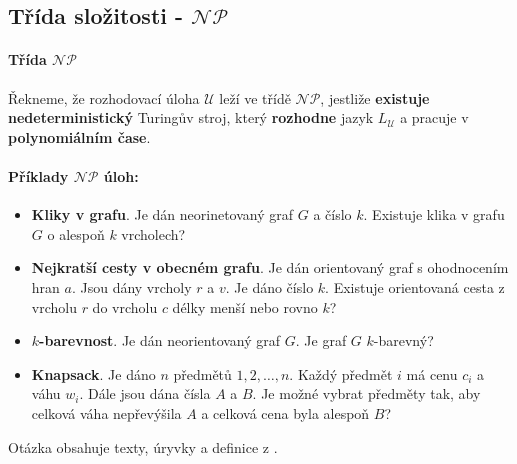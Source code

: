 \subsection*{Třída složitosti - $\mathcal{NP}$}
\label{heading:np}

\paragraph{Třída $\mathcal{NP}$} Řekneme, že rozhodovací úloha $\mathcal{U}$ leží ve třídě $\mathcal{NP}$, jestliže \textbf{existuje nedeterministický} Turingův stroj, který \textbf{rozhodne} jazyk $L_\mathcal{U}$ a pracuje v \textbf{polynomiálním čase}.

\paragraph{Příklady $\mathcal{NP}$ úloh:}
\begin{itemize}[itemsep=0pt]
    \item \textbf{\color{darkBrown}Kliky v grafu}. Je dán neorinetovaný graf $G$ a číslo $k$. Existuje klika v grafu $G$ o alespoň $k$ vrcholech?
    
    \item \textbf{\color{darkBrown}Nejkratší cesty v obecném grafu}. Je dán orientovaný graf s ohodnocením hran $a$. Jsou dány vrcholy $r$ a $v$. Je dáno číslo $k$. Existuje orientovaná cesta z vrcholu $r$ do vrcholu $c$ délky menší nebo rovno $k$?
    
    \item \textbf{\color{darkBrown}$k$-barevnost}. Je dán neorientovaný graf $G$. Je graf $G$ $k$-barevný?    
    \item \textbf{\color{darkBrown}Knapsack}. Je dáno $n$ předmětů $1,2, \dots, n$. Každý předmět $i$ má cenu $c_i$ a váhu $w_i$. Dále jsou dána čísla $A$ a $B$. Je možné vybrat předměty tak, aby celková váha nepřevýšila $A$ a celková cena byla alespoň $B$?
\end{itemize}

Otázka obsahuje texty, úryvky a definice z \cite{tal:demlova}.
